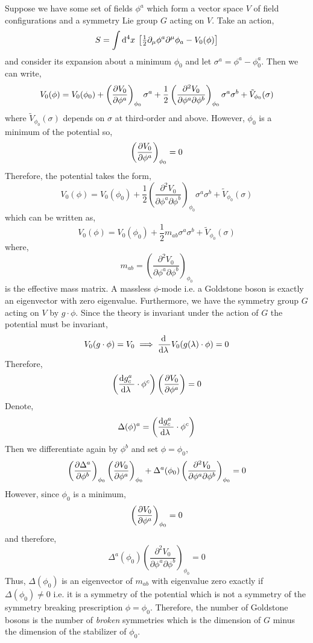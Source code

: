 \documentclass[12pt]{article}
\begin{document}
Suppose we have some set of fields $\phi^a$ which form a vector space $V$ of field configurations and a symmetry Lie group $G$ acting on $V$. Take an action,
\[ S = \int \mathrm{d}^{4} x \: \left[ \tfrac{1}{2} \partial_\mu \phi^a \partial^\mu \phi_a - V_0(\phi) \right] \]
and consider its expansion about a minimum $\phi_0$ and let $\sigma^a = \phi^a - \phi^a_0$. Then we can write,
\[ V_0(\phi) = V_0(\phi_0) + \left( \frac{\partial{V_0}}{\partial{\phi^a}} \right)_{\phi_0} \sigma^a + \frac{1}{2} \left( \frac{\partial^2 V_0}{\partial \phi^a \partial \phi^b} \right)_{\phi_0} \sigma^a \sigma^b + \tilde{V}_{\phi_0}(\sigma) \]
where $\tilde{V}_{\phi_0}(\sigma)$ depends on $\sigma$ at third-order and above. However, $\phi_0$ is a minimum of the potential so,
\[ \left( \frac{\partial{V_0}}{\partial{\phi^a}} \right)_{\phi_0} = 0 \]
Therefore, the potential takes the form,
\[ V_0(\phi) = V_0(\phi_0) + \frac{1}{2} \left( \frac{\partial^2 V_0}{\partial \phi^a \partial \phi^b} \right)_{\phi_0} \sigma^a \sigma^b + \tilde{V}_{\phi_0}(\sigma) \]
which can be written as,
\[ V_0(\phi) = V_0(\phi_0) +  \frac{1}{2} m_{ab} \sigma^a \sigma^b + \tilde{V}_{\phi_0}(\sigma) \]
where,
\[ m_{ab} = \left( \frac{\partial^2 V_0}{\partial \phi^a \partial \phi^b} \right)_{\phi_0} \]
is the effective mass matrix. A massless $\phi$-mode i.e. a Goldstone boson is exactly an eigenvector with zero eigenvalue. Furthermore, we have the symmetry group $G$ acting on $V$ by $g \cdot \phi$. Since the theory is invariant under the action of $G$ the potential must be invariant,
\[ V_0(g \cdot \phi) = V_0 \implies \frac{\mathrm{d} \:}{\mathrm{d}\lambda \:} V_0(g(\lambda) \cdot \phi) = 0 \]  
Therefore,
\[ \left(\frac{\mathrm{d}g^a_c \:}{\mathrm{d}\lambda \:} \cdot \phi^c \right) \left( \frac{\partial{V_0}}{\partial{\phi^a}} \right) = 0 \]
Denote,
\[ 
\Delta(\phi)^a = \left(\frac{\mathrm{d}g^a_c \:}{\mathrm{d}\lambda \:} \cdot \phi^c \right) 
\]
Then we differentiate again by $\phi^b$ and set $\phi = \phi_0$,
\[ \left( \frac{\partial{\Delta^a}}{\partial{\phi^b}} \right)_{\phi_0} \left( \frac{\partial{V_0}}{\partial{\phi^a}} \right)_{\phi_0} + \Delta^a(\phi_0) \left( \frac{\partial^2 V_0}{\partial \phi^a \partial \phi^b} \right)_{\phi_0} = 0 \]
However, since $\phi_0$ is a minimum,
\[ \left( \frac{\partial{V_0}}{\partial{\phi^a}} \right)_{\phi_0} = 0 \]
and therefore,
\[ \Delta^a(\phi_0) \left( \frac{\partial^2 V_0}{\partial \phi^a \partial \phi^b} \right)_{\phi_0} = 0 \]
Thus, $\Delta(\phi_0)$ is an eigenvector of $m_{ab}$ with eigenvalue zero exactly if $\Delta(\phi_0) \neq 0$ i.e. it is a symmetry of the potential which is not a symmetry of the symmetry breaking prescription $\phi = \phi_0$. Therefore, the number of Goldstone bosons is the number of \textit{broken} symmetries which is the dimension of $G$ minus the dimension of the stabilizer of $\phi_0$. 
\end{document}
